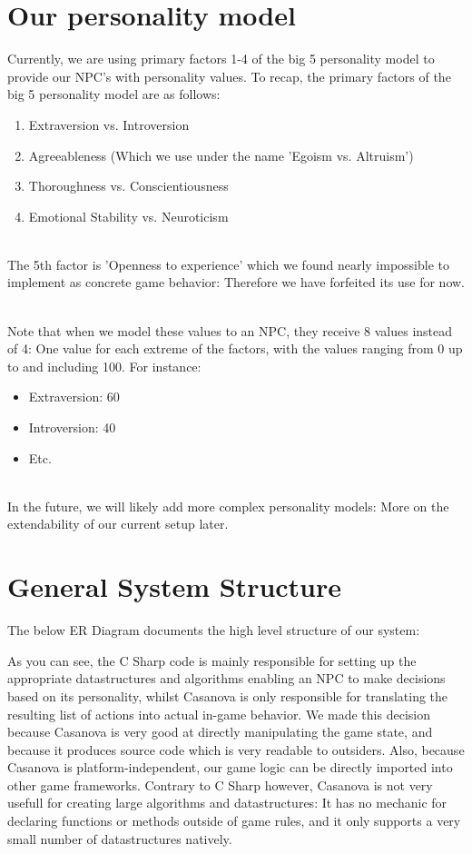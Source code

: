 \documentclass[11pt]{article} %
\begin{document}
\newpage
\section{Our personality model}
Currently, we are using primary factors 1-4 of the big 5 personality model to provide our NPC's with personality values. To recap, the primary factors of the big 5 personality model are as follows:

\begin{enumerate}
\item Extraversion vs. Introversion
\item Agreeableness (Which we use under the name 'Egoism vs. Altruism')
\item Thoroughness vs. Conscientiousness
\item Emotional Stability vs. Neuroticism
\end{enumerate}

~\\
The 5th factor is 'Openness to experience' which we found nearly impossible to implement as concrete game behavior: Therefore we have forfeited its use for now.

~\\
Note that when we model these values to an NPC, they receive 8 values instead of 4: One value for each extreme of the factors, with the values ranging from 0 up to and including 100.
For instance:

\begin{itemize}
\item Extraversion: 60
\item Introversion: 40
\item Etc.
\end{itemize}

~\\
In the future, we will likely add more complex personality models: More on the extendability of our current setup later.

\newpage
\section{General System Structure}
The below ER Diagram documents the high level structure of our system:


As you can see, the C Sharp code is mainly responsible for setting up the appropriate datastructures and algorithms enabling an NPC to make decisions based on its personality, whilst Casanova is only responsible for translating the resulting list of actions into actual in-game behavior. We made this decision because Casanova is very good at directly manipulating the game state, and because it produces source code which is very readable to outsiders. Also, because Casanova is platform-independent, our game logic can be directly imported into other game frameworks. Contrary to C Sharp however, Casanova is not very usefull for creating large algorithms and datastructures: It has no mechanic for declaring functions or methods outside of game rules, and it only supports a very small number of datastructures natively. 
\end{document}
